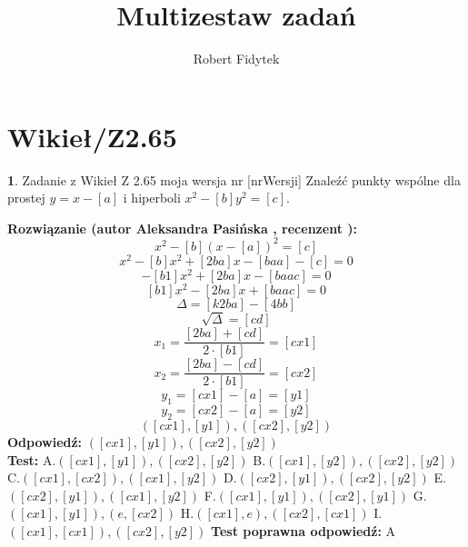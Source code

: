 \documentclass[12pt, a4paper]{article}
\title{Multizestaw zadań}
\author{Robert Fidytek}
\date{}
\theoremstyle{definition} %
\newtheorem{zad}{}
\newcommand{\kategoria}[1]{\section{#1}} %
\newcommand{\zadStart}[1]{\begin{zad}#1\newline} %
\newcommand{\zadStop}{\end{zad}}   %
\newcommand{\rozwStart}[2]{\noindent \textbf{Rozwiązanie (autor #1 , recenzent #2): }\newline} %
\newcommand{\rozwStop}{\newline}                                            %
\newcommand{\odpStart}{\noindent \textbf{Odpowiedź:}\newline}    %
\newcommand{\odpStop}{\newline}                                             %
\newcommand{\testStart}{\noindent \textbf{Test:}\newline} %
\newcommand{\testStop}{\newline} %
\newcommand{\kluczStart}{\noindent \textbf{Test poprawna odpowiedź:}\newline} %
\newcommand{\kluczStop}{\newline} %
\begin{document}
\maketitle


\kategoria{Wikieł/Z2.65}
\zadStart{Zadanie z Wikieł Z 2.65 moja wersja nr [nrWersji]}
Znaleźć punkty wspólne dla prostej $y=x-[a]$ i hiperboli $x^2-[b]y^2=[c]$.
\zadStop
\rozwStart{Aleksandra Pasińska}{}
$$x^2-[b](x-[a])^2=[c]$$
$$x^2-[b]x^2+[2ba]x-[baa]-[c]=0$$
$$-[b1]x^2+[2ba]x-[baac]=0$$
$$[b1]x^2-[2ba]x+[baac]=0$$
$$\Delta=[k2ba]-[4bb]$$
$$\sqrt{\Delta}=[cd]$$
$$x_1=\frac{[2ba]+[cd]}{2\cdot[b1]}=[cx1]$$
$$x_2=\frac{[2ba]-[cd]}{2\cdot[b1]}=[cx2]$$
$$y_1=[cx1]-[a]=[y1]$$
$$y_2=[cx2]-[a]=[y2]$$
$$([cx1],[y1]),([cx2],[y2])$$
\rozwStop
\odpStart
$([cx1],[y1]),([cx2],[y2])$\\
\odpStop
\testStart
A.$([cx1],[y1]),([cx2],[y2])$
B.$ ([cx1],[y2]),([cx2],[y2])$
C.$ ([cx1],[cx2]),([cx1],[y2])$
D.$([cx2],[y1]),([cx2],[y2])$
E.$([cx2],[y1]),([cx1],[y2])$
F.$([cx1],[y1]),([cx2],[y1])$
G.$([cx1],[y1]),(e,[cx2])$
H.$([cx1],e),([cx2],[cx1])$
I.$([cx1],[cx1]),([cx2],[y2])$
\testStop
\kluczStart
A
\kluczStop
\end{document}

